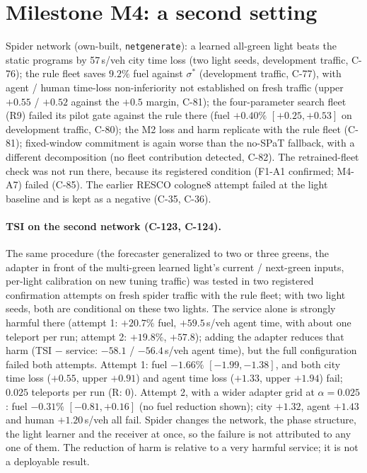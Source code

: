 \documentclass[11pt]{article}
\begin{document}
\section{Milestone M4: a second setting}
Spider network (own-built, \texttt{netgenerate}): a learned all-green light beats the static programs by 57\,s/veh city time loss (two light seeds, development
traffic, C-76); the rule fleet saves $9.2\%$ fuel against $\sigma^*$ (development traffic, C-77), with agent / human time-loss non-inferiority not established on fresh traffic
(upper $+0.55$ / $+0.52$ against the $+0.5$ margin, C-81);
the four-parameter search fleet (R9) failed its pilot gate against the rule there (fuel $+0.40\%$ $[+0.25,+0.53]$ on development
traffic, C-80); the M2 loss and harm replicate with the rule fleet (C-81); fixed-window commitment is again worse than the
no-SPaT fallback, with a different decomposition (no fleet contribution detected, C-82). The retrained-fleet check was not run there, because its registered condition (F1-A1 confirmed; M4-A7) failed (C-85). The
earlier RESCO cologne8 attempt failed at the light baseline and is kept as a negative (C-35, C-36).
\paragraph{TSI on the second network (C-123, C-124).} The same procedure (the forecaster generalized to two or three greens, the adapter
in front of the multi-green learned light's current / next-green inputs, per-light calibration on new tuning traffic) was tested in two registered
confirmation attempts on fresh spider traffic with the rule fleet; with two light seeds, both are conditional on these two lights. The service alone is strongly harmful there (attempt 1: $+20.7\%$ fuel, $+59.5$\,s/veh agent time, with about one
teleport per run; attempt 2: $+19.8\%$, $+57.8$); adding the adapter reduces that harm (TSI $-$ service: $-58.1$ / $-56.4$\,s/veh agent time), but the full configuration failed both attempts. Attempt 1: fuel $-1.66\%$
$[-1.99,-1.38]$, and both city time loss ($+0.55$, upper $+0.91$) and agent time loss ($+1.33$, upper $+1.94$) fail; $0.025$ teleports per
run (R: 0). Attempt 2, with a wider adapter grid at $\alpha=0.025$: fuel $-0.31\%$ $[-0.81,+0.16]$ (no fuel reduction shown); city $+1.32$,
agent $+1.43$ and human $+1.20$\,s/veh all fail. Spider changes the network, the phase structure, the light learner and the receiver at
once, so the failure is not attributed to any one of them. The reduction of harm is relative to a very harmful service; it is not a
deployable result.
\end{document}
